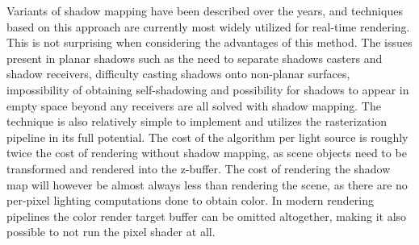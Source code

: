 Variants of shadow mapping have been described over the years, and techniques based on this approach are currently most widely utilized for real-time rendering. This is not surprising when considering the advantages of this method. The issues present in planar shadows such as the need to separate shadows casters and shadow receivers, difficulty casting shadows onto non-planar surfaces, impossibility of obtaining self-shadowing and possibility for shadows to appear in empty space beyond any receivers are all solved with shadow mapping. The technique is also relatively simple to implement and utilizes the rasterization pipeline in its full potential. The cost of the algorithm per light source is roughly twice the cost of rendering without shadow mapping, as scene objects need to be transformed and rendered into the z-buffer. The cost of rendering the shadow map will however be almost always less than rendering the scene, as there are no per-pixel lighting computations done to obtain color. In modern rendering pipelines the color render target buffer can be omitted altogether, making it also possible to not run the pixel shader at all.


